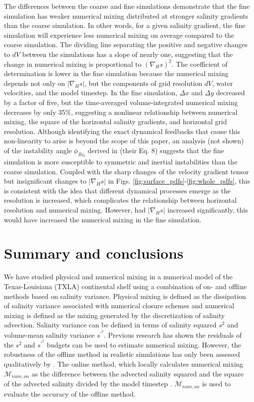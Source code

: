 The differences between the coarse and fine simulations demonstrate that the fine simulation has weaker numerical mixing distributed at stronger salinity gradients than the coarse simulation. In other words, for a given salinity gradient, the fine simulation will experience less numerical mixing on average compared to the coarse simulation. The dividing line separating the positive and negative changes to $dV$ between the simulations has a slope of nearly one, suggesting that the change in numerical mixing is proportional to $(\nabla_H s)^2$. The coefficient of determination is lower in the fine simulation because the numerical mixing depends not only on $|\nabla_H s|$, but the components of grid resolution $dV$, water velocities, and the model timestep. In the fine simulation, $\Delta x$ and $\Delta y$ decreased by a factor of five, but the time-averaged volume-integrated numerical mixing decreases by only 35$\%$, suggesting a nonlinear relationship between numerical mixing, the square of the horizontal salinity gradients, and horizontal grid resolution. Although identifying the exact dynamical feedbacks that cause this non-linearity to arise is beyond the scope of this paper, an analysis (not shown) of the instability angle $\phi_{{Ri}_b}$ derived in \citet{Thomas_2013} (their Eq. 8) suggests that the fine simulation is more susceptible to symmetric and inertial instabilities than the coarse simulation. Coupled with the sharp changes of the velocity gradient tensor but insignificant changes to $|\nabla_H s|$ in Figs. \ref{fig:surface_pdfs}-\ref{fig:whole_pdfs}, this is consistent with the idea that different dynamical processes emerge as the resolution is increased, which complicates the relationship between horizontal resolution and numerical mixing. However, had $|\nabla_H s|$ increased significantly, this would have increased the numerical mixing in the fine simulation.

\section{Summary and conclusions} \label{sec:conclusions_2023}

We have studied physical and numerical mixing in a numerical model of the Texas-Louisiana (TXLA) continental shelf using a combination of on- and offline methods based on salinity variance. Physical mixing is defined as the dissipation of salinity variance associated with numerical closure schemes and numerical mixing is defined as the mixing generated by the discretization of salinity advection. Salinity variance can be defined in terms of salinity squared $s^2$ and volume-mean salinity variance $s^{\prime^2}$. Previous research \citep{Burchard_2019, MacCready_2018, Qu_2022_box} has shown the residuals of the $s^2$ and $s^{\prime^2}$ budgets can be used to estimate numerical mixing. However, the robustness of the offline method in realistic simulations has only been assessed qualitatively by \citet{Wang_2021}. The online method, which locally calculates numerical mixing $\mathcal{M}_{num, on}$ as the difference between the advected salinity squared and the square of the advected salinity divided by the model timestep \citep{Burchard_2008}. $\mathcal{M}_{num, on}$ is used to evaluate the accuracy of the offline method. 

